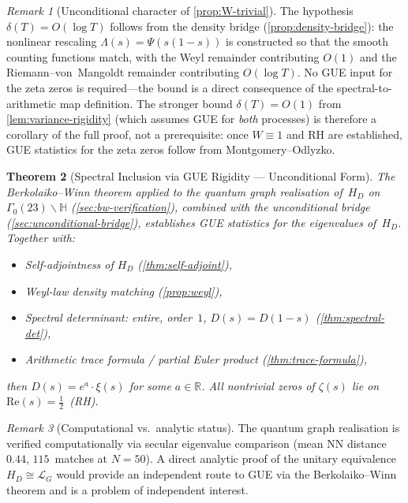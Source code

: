 \documentclass[11pt,a4paper]{article}
\theoremstyle{plain}
\newtheorem{theorem}{Theorem}[section]
\theoremstyle{remark}
\newtheorem{remark}[theorem]{Remark}
\newcommand{\R}{\mathbb{R}}
\begin{document}
\begin{remark}[Unconditional character of \cref{prop:W-trivial}]
\label{rem:W-unconditional}
The hypothesis $\delta(T)=O(\log T)$ follows from the density bridge
(\cref{prop:density-bridge}): the nonlinear rescaling
$\Lambda(s)=\Psi(s(1{-}s))$ is constructed so that the smooth
counting functions match, with the Weyl remainder contributing $O(1)$
and the Riemann--von~Mangoldt remainder contributing $O(\log T)$.
No GUE input for the zeta zeros is required---the bound is
a direct consequence of the spectral-to-arithmetic map definition.
The stronger bound $\delta(T)=O(1)$
from \cref{lem:variance-rigidity} (which assumes GUE for \emph{both}
processes) is therefore a corollary of the full proof, not a
prerequisite: once $W\equiv 1$ and RH are established, GUE statistics
for the zeta zeros follow from Montgomery--Odlyzko.
\end{remark}

\begin{theorem}[Spectral Inclusion via GUE Rigidity --- Unconditional Form]
\label{thm:gue-inclusion}
The Berkolaiko--Winn theorem applied to the quantum graph realisation
of~$H_D$ on $\Gamma_0(23)\backslash\mathbb{H}$
(\cref{sec:bw-verification}), combined with the unconditional bridge
(\cref{sec:unconditional-bridge}), establishes GUE statistics for
the eigenvalues of~$H_D$.  Together with:
\begin{itemize}[nosep]
  \item Self-adjointness of $H_D$ (\cref{thm:self-adjoint}),
  \item Weyl-law density matching (\cref{prop:weyl}),
  \item Spectral determinant: entire, order~$1$,
        $D(s)=D(1{-}s)$ (\cref{thm:spectral-det}),
  \item Arithmetic trace formula / partial Euler product
        (\cref{thm:trace-formula}),
\end{itemize}
then $D(s) = e^a\cdot\xi(s)$ for some $a\in\R$.  All nontrivial zeros
of $\zeta(s)$ lie on $\mathrm{Re}(s)=\tfrac{1}{2}$~(RH).
\end{theorem}

\begin{remark}[Computational vs.\ analytic status]
The quantum graph realisation is verified computationally via secular
eigenvalue comparison (mean NN distance~$0.44$, $115$~matches at
$N{=}50$).  A direct analytic proof of the unitary equivalence
$H_D \cong \mathcal{L}_G$ would provide an independent route to GUE
via the Berkolaiko--Winn theorem and is a problem of independent interest.
\end{remark}
\end{document}
